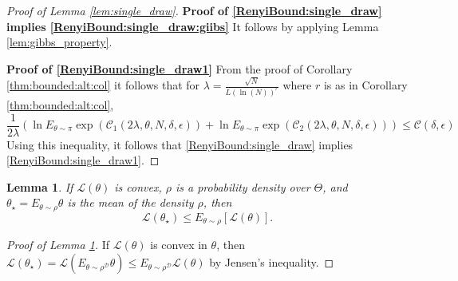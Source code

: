 \documentclass{article}
\newcommand{\train}{\mathcal{D}}
\newtheorem{lemma}[theorem]{Lemma}
\begin{document}
\begin{proof}[Proof of Lemma \ref{lem:single_draw}]
 \textbf{Proof of \eqref{RenyiBound:single_draw} implies \eqref{RenyiBound:single_draw:giibs}}
   It follows by applying Lemma \ref{lem:gibbs_property}. 

  \textbf{Proof of \eqref{RenyiBound:single_draw1}}
     From the proof of Corollary \ref{thm:bounded:alt:col} it follows that
     for $\lambda=\frac{\sqrt{N}}{L(\ln(N))^{r}}$  where
     $r$ is as in Corollary \ref{thm:bounded:alt:col},
     \[
     \frac{1}{2\lambda } \left(   \ln E_{\theta \sim \pi} \exp(\mathcal{C}_1(2\lambda,\theta,N,\delta,\epsilon)) +
           \ln E_{\theta \sim \pi} \exp(\mathcal{C}_2(2\lambda,\theta,N,\delta,\epsilon)) \right)
           \le \mathcal{C}(\delta,\epsilon)
     \]
     Using this inequality, it follows that \eqref{RenyiBound:single_draw} implies \eqref{RenyiBound:single_draw1}.
\end{proof}
\begin{lemma}
\label{lem:bound:mean1}
 If $\mathcal{L}(\theta)$ is convex, $\rho$ is a probability density over $\Theta$, and 
 $\theta_{\star}=E_{\theta \sim \rho} \theta$ is the mean 
 of the density $\rho$, then
 \begin{equation}
  \label{lem:bound:mean:eq1}
     \mathcal{L}(\theta_{\star}) \le E_{\theta \sim \rho}[\mathcal{L}(\theta)].
\end{equation}
\end{lemma}
\begin{proof}[Proof of Lemma \ref{lem:bound:mean1}]
 If $\mathcal{L}(\theta)$ is convex in $\theta$, then 
$\mathcal{L}(\theta_{\star})=\mathcal{L}(E_{\theta \sim \rho^{\train}} \theta)   \le E_{\theta \sim \rho^{\train}} \mathcal{L}(\theta)$ by Jensen's inequality.
\end{proof}
\end{document}

